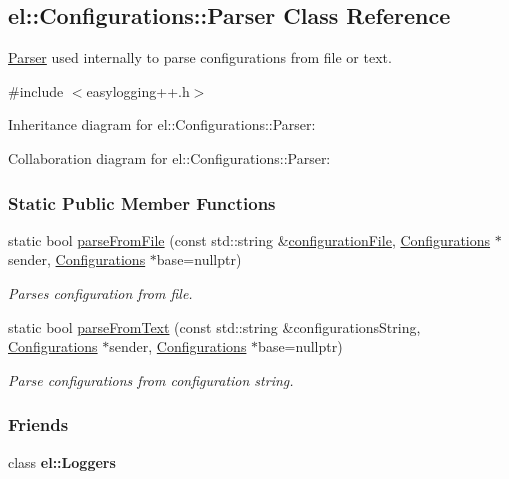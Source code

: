 \hypertarget{a00064}{}\subsection{el\+:\+:Configurations\+:\+:Parser Class Reference}
\label{a00064}


\hyperlink{a00064}{Parser} used internally to parse configurations from file or text.  




{\ttfamily \#include $<$easylogging++.\+h$>$}



Inheritance diagram for el\+:\+:Configurations\+:\+:Parser\+:


Collaboration diagram for el\+:\+:Configurations\+:\+:Parser\+:
\subsubsection*{Static Public Member Functions}
\begin{DoxyCompactItemize}
\item 
static bool \hyperlink{a00064_a45def5007bf368c4d2a505af58cd94c2}{parse\+From\+File} (const std\+::string \&\hyperlink{a00014_a18df64bb5cd97bee672160290133141c}{configuration\+File}, \hyperlink{a00014}{Configurations} $\ast$sender, \hyperlink{a00014}{Configurations} $\ast$base=nullptr)
\begin{DoxyCompactList}\small\item\em Parses configuration from file. \end{DoxyCompactList}\item 
static bool \hyperlink{a00064_a39ec1b06f673e8155a83d66e08229129}{parse\+From\+Text} (const std\+::string \&configurations\+String, \hyperlink{a00014}{Configurations} $\ast$sender, \hyperlink{a00014}{Configurations} $\ast$base=nullptr)
\begin{DoxyCompactList}\small\item\em Parse configurations from configuration string. \end{DoxyCompactList}\end{DoxyCompactItemize}
\subsubsection*{Friends}
\begin{DoxyCompactItemize}
\item 
\hypertarget{a00064_a6efe246b312d02731fb0e1d120c0331d}{}class {\bfseries el\+::\+Loggers}\label{a00064_a6efe246b312d02731fb0e1d120c0331d}

\end{DoxyCompactItemize}


